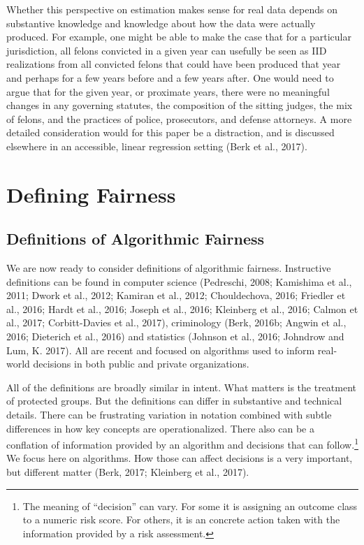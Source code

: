 \documentclass[12pt]{article}
\begin{document}
Whether this perspective on estimation makes sense for real data depends on substantive knowledge and knowledge about how the data were actually produced. For example, one might be able to make the case that for a particular jurisdiction, all felons convicted in a given year can usefully be seen as IID realizations from all convicted felons that could have been produced that year and perhaps for a few years before and a few years after. One would need to argue that for the given year, or proximate years, there were no meaningful changes in any governing statutes, the composition of the sitting judges, the mix of felons, and the practices of police, prosecutors, and defense attorneys. A more detailed consideration would for this paper be a distraction, and is discussed elsewhere in an accessible, linear regression setting (Berk et al., 2017).

\section{Defining Fairness}

 \subsection{Definitions of Algorithmic Fairness}
 
 We are now ready to consider definitions of algorithmic fairness. Instructive definitions can be found in computer science (Pedreschi, 2008; Kamishima et al., 2011; Dwork et al., 2012; Kamiran et al., 2012; Chouldechova, 2016; Friedler et al., 2016; Hardt et al., 2016;  Joseph et al., 2016; Kleinberg et al., 2016; Calmon et al., 2017; Corbitt-Davies et al., 2017), criminology (Berk, 2016b; Angwin et al., 2016; Dieterich et al., 2016) and statistics (Johnson et al., 2016; Johndrow and Lum, K. 2017). All are recent and focused on algorithms used to inform real-world decisions in both public and private organizations.
 
All of the definitions are broadly similar in intent. What matters is the treatment of protected groups. But the definitions can differ in substantive and technical details. There can be frustrating variation in notation combined with subtle differences in how key concepts are operationalized. There also can be a conflation of information provided by an algorithm and decisions that can follow.\footnote
{
The meaning of ``decision'' can vary. For some it is assigning an outcome class to a numeric risk score. For others, it is an concrete action taken with the information provided by a risk assessment. 
}
We focus here on algorithms. How those can affect decisions is a very important, but different matter (Berk, 2017; Kleinberg et al., 2017). 
\end{document}
